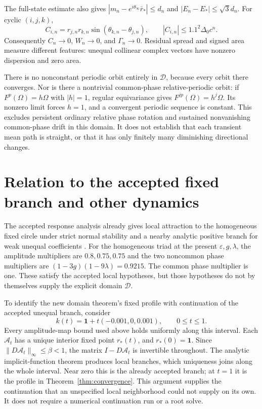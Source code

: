 \documentclass[11pt,a4paper]{article}
\numberwithin{equation}{section}
\theoremstyle{remark}\newtheorem{remark}[theorem]{Remark}
\newcommand{\one}{\mathbf1}\newcommand{\eps}{\varepsilon}
\begin{document}
The full-state estimate also gives $|m_n-e^{i\theta_\infty}\bar r_*|\le d_n$ and $|E_n-E_*|\le\sqrt3d_n$. For cyclic $(i,j,k)$,
\begin{equation}
C_{i,n}=r_{j,n}r_{k,n}\sin(\theta_{k,n}-\theta_{j,n}),
\qquad |C_{i,n}|\le1.1^2\Delta_0c^n.\label{eq:Cdecay}
\end{equation}
Consequently $C_n\to0$, $W_n\to0$, and $\Gamma_n\to0$. Residual spread and signed area measure different features: unequal collinear complex vectors have nonzero dispersion and zero area.

There is no nonconstant periodic orbit entirely in $\mathcal D$, because every orbit there converges. Nor is there a nontrivial common-phase relative-periodic orbit: if $F^p(\Omega)=h\Omega$ with $|h|=1$, regular equivariance gives $F^{jp}(\Omega)=h^j\Omega$. Its nonzero limit forces $h=1$, and a convergent periodic sequence is constant. This excludes persistent ordinary relative phase rotation and sustained nonvanishing common-phase drift in this domain. It does not establish that each transient mean path is straight, or that it has only finitely many diminishing directional changes.

\section{Relation to the accepted fixed branch and other dynamics}\label{sec:prior}

The accepted response analysis already gives local attraction to the homogeneous fixed circle under strict normal stability and a nearby analytic positive branch for weak unequal coefficients \cite{response}. For the homogeneous triad at the present $\eps,g,\lambda$, the amplitude multipliers are $0.8,0.75,0.75$ and the two noncommon phase multipliers are $(1-3g)(1-9\lambda)=0.9215$. The common phase multiplier is one. These satisfy the accepted local hypotheses, but those hypotheses do not by themselves supply the explicit domain $\mathcal D$.

To identify the new domain theorem's fixed profile with continuation of the accepted unequal branch, consider
\begin{equation}
k(t)=\one+t(-0.001,0,0.001),\qquad0\le t\le1.\label{eq:continuation}
\end{equation}
Every amplitude-map bound used above holds uniformly along this interval. Each $\mathcal A_t$ has a unique interior fixed point $r_*(t)$, and $r_*(0)=\one$. Since $\|D\mathcal A_t\|_\infty\le\beta<1$, the matrix $I-D\mathcal A_t$ is invertible throughout. The analytic implicit-function theorem produces local branches, which uniqueness joins along the whole interval. Near zero this is the already accepted branch; at $t=1$ it is the profile in Theorem~\ref{thm:convergence}. This argument supplies the continuation that an unspecified local neighborhood could not supply on its own. It does not require a numerical continuation run or a root solve.
\end{document}
